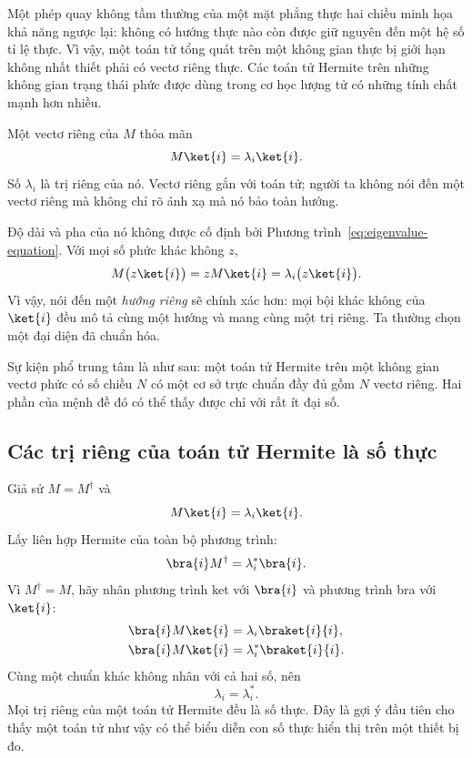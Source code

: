 Một phép quay không tầm thường của một mặt phẳng thực hai chiều minh họa khả năng ngược lại: không có hướng thực nào còn được giữ nguyên đến một hệ số tỉ lệ thực. Vì vậy, một toán tử tổng quát trên một không gian thực bị giới hạn không nhất thiết phải có vectơ riêng thực. Các toán tử Hermite trên những không gian trạng thái phức được dùng trong cơ học lượng tử có những tính chất mạnh hơn nhiều.

Một vectơ riêng của \(M\) thỏa mãn
\begin{equation}
M\ket{i}=\lambda_i\ket{i}.
\label{eq:eigenvalue-equation}
\end{equation}
Số \(\lambda_i\) là trị riêng của nó. Vectơ riêng gắn với toán tử; người ta không nói đến một vectơ riêng mà không chỉ rõ ánh xạ mà nó bảo toàn hướng.

Độ dài và pha của nó không được cố định bởi Phương trình~\eqref{eq:eigenvalue-equation}. Với mọi số phức khác không \(z\),
\[
M\bigl(z\ket{i}\bigr)
=zM\ket{i}
=\lambda_i\bigl(z\ket{i}\bigr).
\]
Vì vậy, nói đến một \emph{hướng riêng} sẽ chính xác hơn: mọi bội khác không của \(\ket{i}\) đều mô tả cùng một hướng và mang cùng một trị riêng. Ta thường chọn một đại diện đã chuẩn hóa.

Sự kiện phổ trung tâm là như sau: một toán tử Hermite trên một không gian vectơ phức có số chiều \(N\) có một cơ sở trực chuẩn đầy đủ gồm \(N\) vectơ riêng. Hai phần của mệnh đề đó có thể thấy được chỉ với rất ít đại số.

\subsection{Các trị riêng của toán tử Hermite là số thực}

Giả sử \(M=M^\dagger\) và
\[
M\ket{i}=\lambda_i\ket{i}.
\]
Lấy liên hợp Hermite của toàn bộ phương trình:
\begin{equation}
\bra{i}M^\dagger=\lambda_i^*\bra{i}.
\label{eq:eigen-bra-equation}
\end{equation}
Vì \(M^\dagger=M\), hãy nhân phương trình ket với \(\bra{i}\) và phương trình bra với \(\ket{i}\):
\begin{align}
\bra{i}M\ket{i}&=\lambda_i\braket{i}{i},\\
\bra{i}M\ket{i}&=\lambda_i^*\braket{i}{i}.
\end{align}
Cùng một chuẩn khác không nhân với cả hai số, nên
\begin{equation}
\lambda_i=\lambda_i^*.
\end{equation}
Mọi trị riêng của một toán tử Hermite đều là số thực. Đây là gợi ý đầu tiên cho thấy một toán tử như vậy có thể biểu diễn con số thực hiển thị trên một thiết bị đo.

